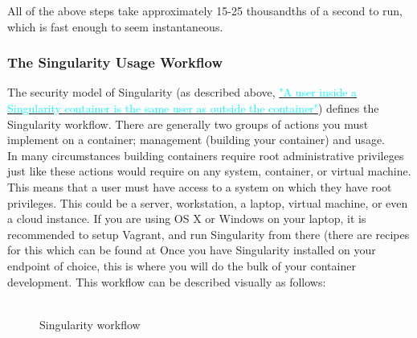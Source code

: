 \documentclass[a4paper]{article}
\begin{document}
All of the above steps take approximately 15-25 thousandths of a second to run, which is fast enough to seem instantaneous.
\subsubsection{The Singularity Usage Workflow}

The security model of Singularity (as described above, \hyperref[sec:securityandpriviledge]{{\textcolor{cyan}{"A user inside a Singularity container is the same user as outside the container"}}}) defines the Singularity workflow. There are generally two groups of actions you must implement on a container; management (building your container) and usage.\\[0.1in]

In many circumstances building containers require root administrative privileges just like these actions would require on any system, container, or virtual machine. This means that a user must have access to a system on which they have root privileges. This could be a server, workstation, a laptop, virtual machine, or even a cloud instance. If you are using OS X or Windows on your laptop, it is recommended to setup Vagrant, and run Singularity from there (there are recipes for this which can be found at  Once you have Singularity installed on your endpoint of choice, this is where you will do the bulk of your container development.
This workflow can be described visually as follows:
\\[0.1in]
\begin{figure}[h]
\centering
\hspace*{-0.62in}
\includegraphics[width=0.5,height=0.5]{flow.png}
\caption{Singularity workflow}
\end{figure}
\end{document}
